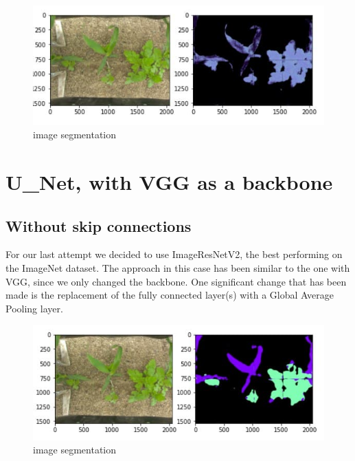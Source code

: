 \documentclass[12pt,a4paper]{report}
\begin{document}
\begin{figure}[H]
	\includegraphics[scale = 1.2, center]{MobileNetV2}
	\caption{image segmentation}
\end{figure}

		\section{U\_Net, with VGG as a backbone}
	\subsection{Without skip connections}
For our last attempt we decided to use ImageResNetV2, the best performing on the ImageNet dataset. The approach in this case has been similar to the one with VGG, since we only changed the backbone. One significant change that has been made is the replacement of the fully connected layer(s) with a Global Average Pooling layer.

\begin{figure}[H]
	\includegraphics[scale = .7, center]{vgg_upsampling_without}
	\caption{image segmentation}
\end{figure}
\end{document}

